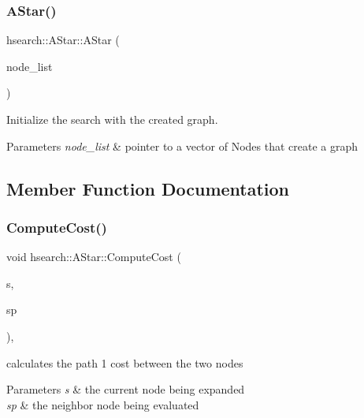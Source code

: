\subsubsection{\texorpdfstring{A\+Star()}{AStar()}}
{\footnotesize\ttfamily hsearch\+::\+A\+Star\+::\+A\+Star (\begin{DoxyParamCaption}\item[{std\+::vector$<$ \hyperlink{structprm_1_1Node}{prm\+::\+Node} $>$ $\ast$}]{node\+\_\+list }\end{DoxyParamCaption})\hspace{0.3cm}{\ttfamily [inline]}}



Initialize the search with the created graph. 


\begin{DoxyParams}{Parameters}
{\em node\+\_\+list} & pointer to a vector of Nodes that create a graph \\
\hline
\end{DoxyParams}


\subsection{Member Function Documentation}
\mbox{\label{classhsearch_1_1AStar_a3a9a3c398437d9efe0b9943c29a8672b}} 
\subsubsection{\texorpdfstring{Compute\+Cost()}{ComputeCost()}}
{\footnotesize\ttfamily void hsearch\+::\+A\+Star\+::\+Compute\+Cost (\begin{DoxyParamCaption}\item[{\hyperlink{structhsearch_1_1SearchNode}{Search\+Node} \&}]{s,  }\item[{\hyperlink{structhsearch_1_1SearchNode}{Search\+Node} \&}]{sp }\end{DoxyParamCaption})\hspace{0.3cm}{\ttfamily [protected]}, {\ttfamily [virtual]}}



calculates the path 1 cost between the two nodes 


\begin{DoxyParams}{Parameters}
{\em s} & the current node being expanded \\
\hline
{\em sp} & the neighbor node being evaluated \\
\hline
\end{DoxyParams}


